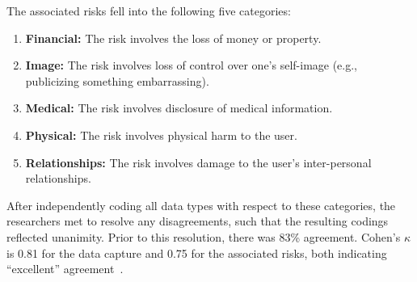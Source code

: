 The associated risks fell into the following five categories:
\begin{enumerate}[topsep=0pt,itemsep=-1ex,partopsep=1ex,parsep=1ex]
\item {\bf Financial:} The risk involves the loss of money or property.
\item {\bf Image:} The risk involves loss of control over one's self-image (e.g., publicizing something embarrassing).
\item {\bf Medical:} The risk involves disclosure of medical information.
\item {\bf Physical:} The risk involves physical harm to the user.
\item {\bf Relationships:} The risk involves damage to the user's inter-personal relationships.
\end{enumerate}

After independently coding all data types with respect to these categories, the researchers met to resolve any disagreements, such that the resulting codings reflected unanimity. Prior to this resolution, there was  83\% agreement. Cohen's $\kappa$ is 0.81 for the data capture and 0.75 for the associated risks, both indicating ``excellent'' agreement~\cite{Fleiss2003}.










